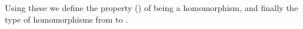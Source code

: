 \begin{code}
\AgdaSpace{}%
\AgdaSymbol{(}\AgdaSpace{}%
\AgdaSpace{}%
\AgdaSymbol{)}\<%
\\
%
\\[\AgdaEmptyExtraSkip]%
%
\>[1]\AgdaSpace{}%
\AgdaSymbol{:}\AgdaSpace{}%
\AgdaSymbol{(}\AgdaOperator{\AgdaFunction{𝔻[}}\AgdaSpace{}%
\AgdaSpace{}%
\AgdaOperator{\AgdaFunction{]}}\AgdaSpace{}%
\AgdaSpace{}%
\AgdaOperator{\AgdaFunction{𝔻[}}\AgdaSpace{}%
\AgdaSpace{}%
\AgdaOperator{\AgdaFunction{]}}\AgdaSymbol{)}\AgdaSpace{}%
\AgdaSpace{}%
\AgdaSpace{}%
\AgdaSymbol{\AgdaUnderscore{}}\<%
\\
%
\>[1]\AgdaSpace{}%
\AgdaSpace{}%
\AgdaSymbol{=}\AgdaSpace{}%
\AgdaSpace{}%
\AgdaSymbol{\{}\AgdaSymbol{\}}\AgdaSpace{}%
\AgdaSpace{}%
\AgdaSpace{}%
\AgdaSpace{}%
\<%
\\
\>[0]\<%
\end{code}
Using these we define the property () of being a homomorphism, and
finally the type  of homomorphisms from  to .

